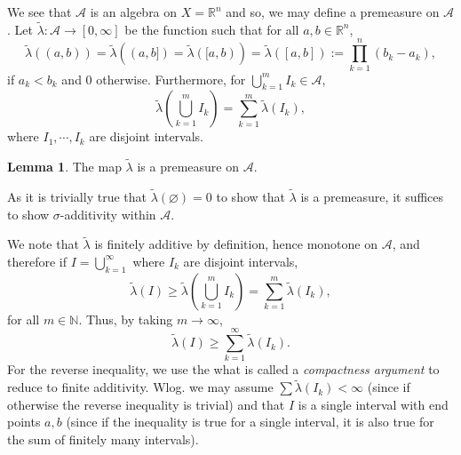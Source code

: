 \documentclass[
]{article}
\theoremstyle{definition}
\theoremstyle{definition}
\newtheorem{lemma}{Lemma}[section]
\begin{document}
We see that \(\mathcal{A}\) is an algebra on \(X = \mathbb{R}^n\) and
so, we may define a premeasure on \(\mathcal{A}\). Let
\(\tilde{\lambda} : \mathcal{A} \to [0, \infty]\) be the function such
that for all \(a, b \in \mathbb{R}^n\),
\[\tilde{\lambda}((a, b)) = \tilde{\lambda}((a, b]) = 
  \tilde{\lambda}([a, b)) = \tilde{\lambda}([a, b]) := \prod_{k = 1}^n(b_k - a_k),\]
if \(a_k < b_k\) and 0 otherwise. Furthermore, for
\(\bigcup_{k = 1}^m I_k \in \mathcal{A}\),
\[\tilde{\lambda}\left(\bigcup_{k = 1}^m I_k \right) = \sum_{k = 1}^m \tilde{\lambda}(I_k),\]
where \(I_1, \cdots, I_k\) are disjoint intervals.

\begin{lemma}
  The map \(\tilde{\lambda}\) is a premeasure on \(\mathcal{A}\).
\end{lemma}
\proof

As it is trivially true that \(\tilde{\lambda}(\varnothing) = 0\) to
show that \(\tilde{\lambda}\) is a premeasure, it suffices to show
\(\sigma\)-additivity within \(\mathcal{A}\).

We note that \(\tilde{\lambda}\) is finitely additive by definition,
hence monotone on \(\mathcal{A}\), and therefore if
\(I = \bigcup_{k = 1}^\infty\) where \(I_k\) are disjoint intervals,
\[\tilde{\lambda}(I) \ge \tilde{\lambda}\left(\bigcup_{k = 1}^m I_k\right) = 
    \sum_{k = 1}^m\tilde{\lambda}(I_k),\] for all \(m \in \mathbb{N}\).
Thus, by taking \(m \to \infty\),
\[\tilde{\lambda}(I) \ge \sum_{k = 1}^\infty \tilde{\lambda}(I_k).\] For
the reverse inequality, we use the what is called a \emph{compactness
argument} to reduce to finite additivity. Wlog. we may assume
\(\sum \tilde{\lambda}(I_k) < \infty\) (since if otherwise the reverse
inequality is trivial) and that \(I\) is a single interval with end
points \(a, b\) (since if the inequality is true for a single interval,
it is also true for the sum of finitely many intervals).
\end{document}
